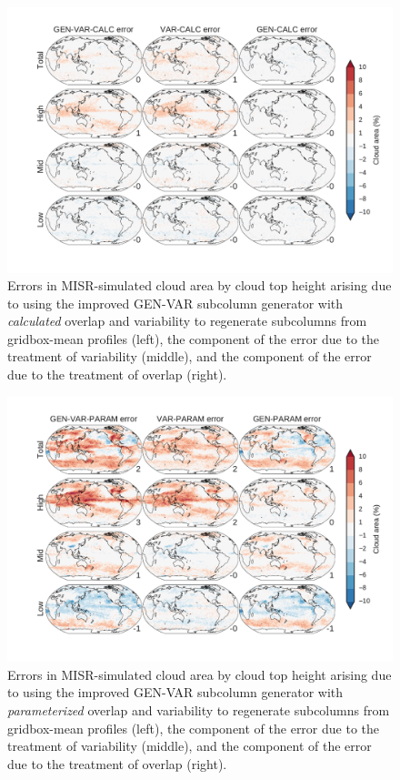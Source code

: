 \begin{figure}
\centering
\includegraphics[width=\columnwidth]{graphics/subgrid2_cldmisr_maps_gen-var-calc_diff.pdf}
\caption{Errors in MISR-simulated cloud area by cloud top height arising due to using the improved GEN-VAR subcolumn generator with \emph{calculated} overlap and variability to regenerate subcolumns from gridbox-mean profiles (left), the component of the error due to the treatment of variability (middle), and the component of the error due to the treatment of overlap (right).}
\label{subgrid2_cldmisr_maps_gen-var-calc_diff}
\end{figure}

\begin{figure}
\centering
\includegraphics[width=\columnwidth]{graphics/subgrid2_cldmisr_maps_gen-var-param_diff.pdf}
\caption{Errors in MISR-simulated cloud area by cloud top height arising due to using the improved GEN-VAR subcolumn generator with \emph{parameterized} overlap and variability to regenerate subcolumns from gridbox-mean profiles (left), the component of the error due to the treatment of variability (middle), and the component of the error due to the treatment of overlap (right).}
\label{subgrid2_cldmisr_maps_gen-var-param_diff}
\end{figure}


